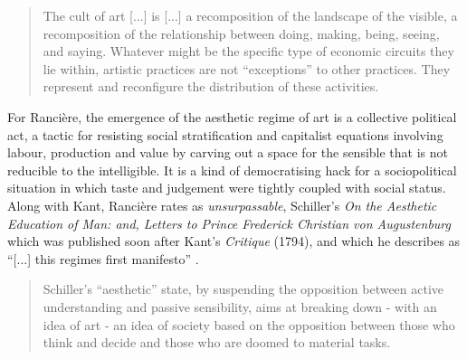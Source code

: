     \begin{quote}	
        The cult of art [...] is [...] a recomposition of the landscape of the visible, a recomposition of the relationship between doing, making, being, seeing, and saying. Whatever might be the specific type of economic circuits they lie within, artistic practices are not “exceptions” to other practices. They represent and reconfigure the distribution of these activities. \citep[p.45]{RancierPltcsOfThAsthtcs2004}
    \end{quote}	
    
    For Rancière, the emergence of the aesthetic regime of art is a collective political act, a tactic for resisting social stratification and capitalist equations involving labour, production and value by carving out a space for the sensible that is not reducible to the intelligible. It is a kind of democratising hack for a sociopolitical situation in which taste and judgement were tightly coupled with social status. Along with Kant, Rancière rates as \emph{unsurpassable}, Schiller's \emph{On the Aesthetic Education of Man: and, Letters to Prince Frederick Christian von Augustenburg} which was published soon after Kant's \emph{Critique} (1794), and which he describes as “[...] this regimes first manifesto” \citep[pp.23-24]{RancierPltcsOfThAsthtcs2004}.
        
    
    \begin{quote}	
        Schiller's “aesthetic” state, by suspending the opposition between active understanding and passive sensibility, aims at breaking down - with an idea of art - an idea of society based on the opposition between those who think and decide and those who are doomed to material tasks. \citep[p.44]{RancierPltcsOfThAsthtcs2004}
    \end{quote}	

